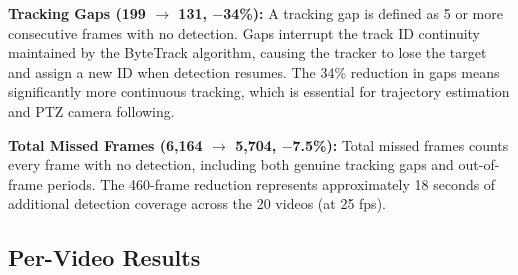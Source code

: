 \documentclass[12pt,a4paper]{report}
\begin{document}
\textbf{Tracking Gaps (199 $\to$ 131, $-$34\%):}
A tracking gap is defined as 5 or more consecutive frames with no detection.
Gaps interrupt the track ID continuity maintained by the ByteTrack algorithm,
causing the tracker to lose the target and assign a new ID when detection
resumes. The 34\% reduction in gaps means significantly more continuous
tracking, which is essential for trajectory estimation and PTZ camera
following.

\textbf{Total Missed Frames (6,164 $\to$ 5,704, $-$7.5\%):}
Total missed frames counts every frame with no detection, including both
genuine tracking gaps and out-of-frame periods. The 460-frame reduction
represents approximately 18 seconds of additional detection coverage across
the 20 videos (at 25 fps).

\subsection{Per-Video Results}
\end{document}
